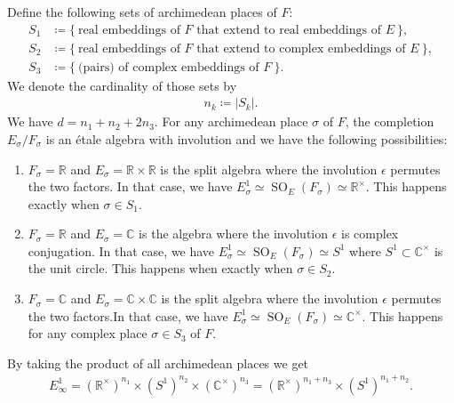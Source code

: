 \documentclass[11pt]{article} %
\newcommand{\8}{\infty}
\newcommand{\SO}{\operatorname{SO}}
\newcommand{\R}{\mathbb{R}}
\newcommand{\C}{\mathbb{C}}
\theoremstyle{mytheoremstyle}
\theoremstyle{remark}
\numberwithin{equation}{section}
\begin{document}
Define the following sets of archimedean places of $F$:
\begin{align}    
    S_1 & \coloneqq \{ \ \textrm{real embeddings of $F$ that extend to real embeddings of $E$} \ \}, \nonumber \\
    S_2 & \coloneqq \{ \ \textrm{real embeddings of $F$ that extend to complex embeddings of $E$} \ \}, \\
    S_3 & \coloneqq \{ \ \textrm{(pairs) of complex embeddings of $F$} \ \}. \nonumber
\end{align}
We denote the cardinality of those sets by
\begin{align} \label{defni}
    n_k \coloneqq \vert S_k \vert.
\end{align} We have $d=n_1+n_2+2n_3$. For any archimedean place $\sigma$ of $F$, the completion $E_\sigma/F_\sigma$ is an \'etale algebra with involution and we have the following possibilities:
\begin{enumerate}
    \item $F_\sigma=\R$ and $E_\sigma=\R \times \R$ is the split algebra where the involution $\epsilon$ permutes the two factors. In that case, we have $E^1_\sigma \simeq \SO_E(F_\sigma)\simeq \R^\times$. This happens exactly when $\sigma \in S_1$.
    \item $F_\sigma=\R$ and $E_\sigma=\C$ is the algebra where the involution $\epsilon$ is complex conjugation. In that case, we have $E^1_\sigma \simeq \SO_E(F_\sigma)\simeq S^1$ where $S^1 \subset \C^\times$ is the unit circle. This happens when exactly when $\sigma \in S_2$.
    \item $F_\sigma=\C$ and $E_\sigma=\C \times \C$ is the split algebra where the involution $\epsilon$ permutes the two factors.In that case, we have $E^1_\sigma \simeq \SO_E(F_\sigma)\simeq \C^\times$. This happens for any complex place $\sigma \in S_3$ of $F$.
\end{enumerate}
By taking the product of all archimedean places we get
\begin{align} \label{dimen1}
    E_\8^1 = (\R^{\times})^{n_1} \times (S^1)^{n_2} \times (\C^\times)^{n_3} = (\R^{\times})^{n_1+n_3} \times (S^1)^{n_1+n_2}.
\end{align}
\end{document}

